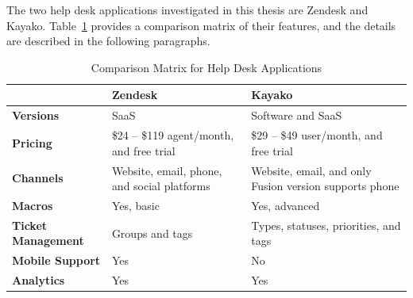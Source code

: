 The two help desk applications investigated in this thesis are Zendesk and Kayako. Table~\ref{tab:comp_matr_help} provides a comparison matrix of their features, and the details are described in the following paragraphs.

\clearpage

\begin{table}[H]
\begin{center}
	\caption[Comparison Matrix for Help Desk Applications]{Comparison Matrix for Help Desk Applications} \label{tab:comp_matr_help}
    \begin{tabular}{ | p{3cm} | p{5cm} | p{5cm} | }
	\hline
	& \textbf{Zendesk} & \textbf{Kayako} \\ \hline
	\textbf{Versions} & SaaS & Software and SaaS \\ \hline
	\textbf{Pricing} & \$24 -- \$119 agent/month, and free trial & \$29 -- \$49 user/month, and free trial \\ \hline
	\textbf{Channels} & Website, email, phone, and social platforms & Website, email, and only Fusion version supports phone \\ \hline
	\textbf{Macros} & Yes, basic & Yes, advanced \\ \hline
	\textbf{Ticket Management} & Groups and tags & Types, statuses, priorities, and tags \\ \hline
	\textbf{Mobile Support} & Yes & No \\ \hline
	\textbf{Analytics} & Yes & Yes \\ \hline
    \end{tabular}
\end{center}
\end{table}

